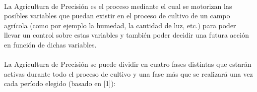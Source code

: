 \documentclass[../../memoria.tex]{subfiles}
\begin{document}
\paragraph{}
La Agricultura de Precisión es el proceso mediante el cual se motorizan las posibles variables que puedan existir en el proceso de cultivo de un campo agrícola (como por ejemplo la humedad, la cantidad de luz, etc.) para poder llevar un control sobre estas variables y también poder decidir una futura acción en función de dichas variables.

\paragraph{}
La Agricultura de Precisión se puede dividir en cuatro fases distintas que estarán activas durante todo el proceso de cultivo y una fase más que se realizará una vez cada período elegido (basado en [1]):
\end{document}
